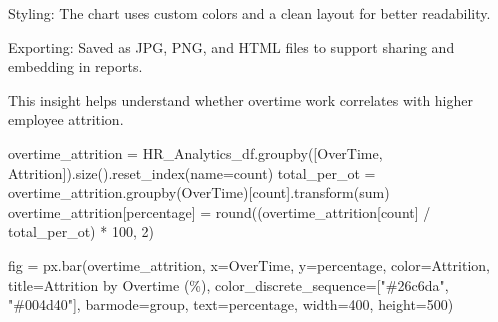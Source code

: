 \documentclass[
  letterpaper,
  DIV=11,
  numbers=noendperiod]{scrartcl}
\newenvironment{Shaded}{\begin{snugshade}}{\end{snugshade}}
\newcommand{\BuiltInTok}[1]{\textcolor[rgb]{0.00,0.23,0.31}{#1}}
\newcommand{\DecValTok}[1]{\textcolor[rgb]{0.68,0.00,0.00}{#1}}
\newcommand{\NormalTok}[1]{\textcolor[rgb]{0.00,0.23,0.31}{#1}}
\newcommand{\OperatorTok}[1]{\textcolor[rgb]{0.37,0.37,0.37}{#1}}
\newcommand{\StringTok}[1]{\textcolor[rgb]{0.13,0.47,0.30}{#1}}
\begin{document}
Styling: The chart uses custom colors and a clean layout for better
readability.

Exporting: Saved as JPG, PNG, and HTML files to support sharing and
embedding in reports.

This insight helps understand whether overtime work correlates with
higher employee attrition.

\begin{Shaded}
\begin{Highlighting}[]
\NormalTok{overtime\_attrition }\OperatorTok{=}\NormalTok{ HR\_Analytics\_df.groupby([}\StringTok{\textquotesingle{}OverTime\textquotesingle{}}\NormalTok{, }\StringTok{\textquotesingle{}Attrition\textquotesingle{}}\NormalTok{]).size().reset\_index(name}\OperatorTok{=}\StringTok{\textquotesingle{}count\textquotesingle{}}\NormalTok{)}
\NormalTok{total\_per\_ot }\OperatorTok{=}\NormalTok{ overtime\_attrition.groupby(}\StringTok{\textquotesingle{}OverTime\textquotesingle{}}\NormalTok{)[}\StringTok{\textquotesingle{}count\textquotesingle{}}\NormalTok{].transform(}\StringTok{\textquotesingle{}sum\textquotesingle{}}\NormalTok{)}
\NormalTok{overtime\_attrition[}\StringTok{\textquotesingle{}percentage\textquotesingle{}}\NormalTok{] }\OperatorTok{=} \BuiltInTok{round}\NormalTok{((overtime\_attrition[}\StringTok{\textquotesingle{}count\textquotesingle{}}\NormalTok{] }\OperatorTok{/}\NormalTok{ total\_per\_ot) }\OperatorTok{*} \DecValTok{100}\NormalTok{, }\DecValTok{2}\NormalTok{)}

\NormalTok{fig }\OperatorTok{=}\NormalTok{ px.bar(overtime\_attrition,}
\NormalTok{             x}\OperatorTok{=}\StringTok{\textquotesingle{}OverTime\textquotesingle{}}\NormalTok{,}
\NormalTok{             y}\OperatorTok{=}\StringTok{\textquotesingle{}percentage\textquotesingle{}}\NormalTok{,}
\NormalTok{             color}\OperatorTok{=}\StringTok{\textquotesingle{}Attrition\textquotesingle{}}\NormalTok{,}
\NormalTok{             title}\OperatorTok{=}\StringTok{\textquotesingle{}Attrition by Overtime (\%)\textquotesingle{}}\NormalTok{,}
\NormalTok{             color\_discrete\_sequence}\OperatorTok{=}\NormalTok{[}\StringTok{"\#26c6da"}\NormalTok{, }\StringTok{"\#004d40"}\NormalTok{],}
\NormalTok{             barmode}\OperatorTok{=}\StringTok{\textquotesingle{}group\textquotesingle{}}\NormalTok{,}
\NormalTok{             text}\OperatorTok{=}\StringTok{\textquotesingle{}percentage\textquotesingle{}}\NormalTok{,}
\NormalTok{             width}\OperatorTok{=}\DecValTok{400}\NormalTok{,}
\NormalTok{             height}\OperatorTok{=}\DecValTok{500}\NormalTok{)}


\end{Highlighting}
\end{Shaded}
\end{document}
